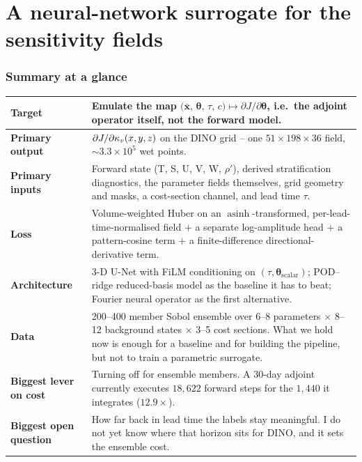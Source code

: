 \part{A neural-network surrogate for the sensitivity fields}

\section{Summary at a glance}

\begin{center}
\begin{tabularx}{\textwidth}{@{}lL@{}}
\toprule
\textbf{Target} & Emulate the map
$\big(\bar{\mathbf{x}},\,\boldsymbol{\theta},\,\tau,\,c\big)\mapsto
\partial J/\partial\boldsymbol{\theta}$, i.e.\ the adjoint operator itself,
not the forward model.\\
\midrule
\textbf{Primary output} & $\partial J/\partial\kappa_{v}(x,y,z)$ on the DINO grid --
one $51\times198\times36$ field, $\sim\!3.3\times10^{5}$ wet points.\\
\textbf{Primary inputs} & Forward state (T, S, U, V, W, $\rho'$), derived
stratification diagnostics, the parameter fields themselves, grid geometry and
masks, a cost-section channel, and lead time $\tau$.\\
\textbf{Loss} & Volume-weighted Huber on an $\operatorname{asinh}$-transformed,
per-lead-time-normalised field $+$ a separate log-amplitude head $+$ a
pattern-cosine term $+$ a finite-difference directional-derivative term.\\
\textbf{Architecture} & 3-D U-Net with FiLM conditioning on $(\tau,
\boldsymbol{\theta}_{\text{scalar}})$; POD--ridge reduced-basis model as the
baseline it has to beat; Fourier neural operator as the first alternative.\\
\textbf{Data} & 200--400 member Sobol ensemble over 6--8 parameters
$\times$ 8--12 background states $\times$ 3--5 cost sections. What we hold now
is enough for a baseline and for building the pipeline, but not to train a
parametric surrogate.\\
\textbf{Biggest lever on cost} & Turning off  for ensemble
members. A 30-day adjoint currently executes $18{,}622$ forward steps for the
$1{,}440$ it integrates ($12.9\times$).\\
\textbf{Biggest open question} & How far back in lead time the labels stay
meaningful. I do not yet know where that horizon sits for DINO, and it sets
the ensemble cost.\\
\bottomrule
\end{tabularx}
\end{center}

